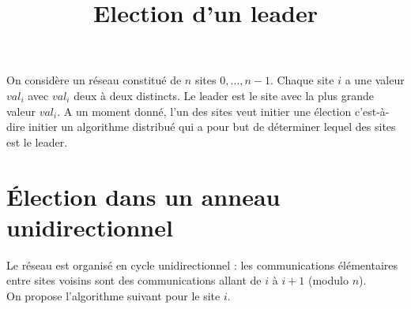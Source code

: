 \documentclass{article}
\title{Election d'un leader}
\begin{document}
\maketitle


On considère un réseau constitué de $n$ sites $0,\ldots,n - 1$. Chaque site $i$ a une valeur $val_i$ avec $val_i$ deux à deux distincts. Le leader est le site avec la plus grande valeur $val_i$. A un moment donné, l'un des sites veut initier une élection c'est-à-dire initier un algorithme distribué qui a pour but de déterminer lequel des sites est le leader.


\section*{Élection dans un anneau unidirectionnel}
Le réseau est organisé en cycle unidirectionnel : les communications élémentaires entre sites voisins sont des communications allant de $i$ à $i + 1$ (modulo $n$).\\
On propose l'algorithme suivant pour le site $i$.\\
\end{document}
